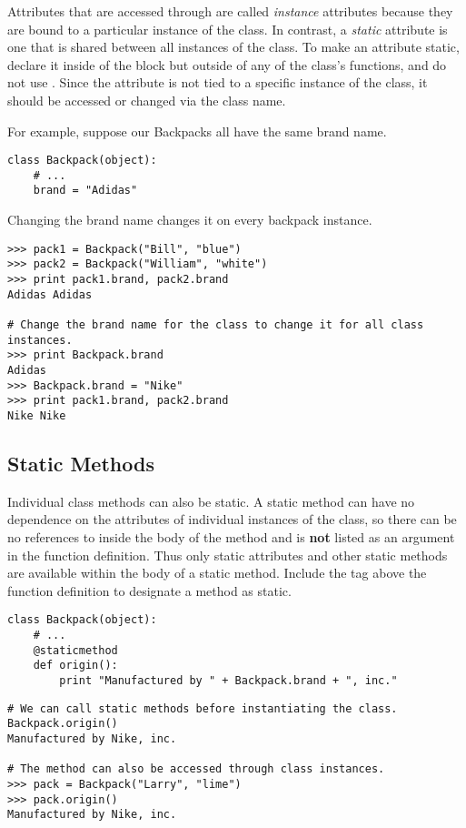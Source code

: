 Attributes that are accessed through  are called \emph{instance} attributes because they are bound to a particular instance of the class.
In contrast, a \emph{static} attribute is one that is shared between all instances of the class.
To make an attribute static, declare it inside of the  block but outside of any of the class's functions, and do not use .
Since the attribute is not tied to a specific instance of the class, it should be accessed or changed via the class name.

For example, suppose our Backpacks all have the same brand name.

\begin{lstlisting}
class Backpack(object):
    # ...
    brand = "Adidas"
\end{lstlisting}

Changing the brand name changes it on every backpack instance.

\begin{lstlisting}
>>> pack1 = Backpack("Bill", "blue")
>>> pack2 = Backpack("William", "white")
>>> print pack1.brand, pack2.brand
Adidas Adidas

# Change the brand name for the class to change it for all class instances.
>>> print Backpack.brand
Adidas
>>> Backpack.brand = "Nike"
>>> print pack1.brand, pack2.brand
Nike Nike
\end{lstlisting}

\subsection*{Static Methods} %

Individual class methods can also be static.
A static method can have no dependence on the attributes of individual instances of the class, so there can be no references to  inside the body of the method and  is \textbf{not} listed as an argument in the function definition.
Thus only static attributes and other static methods are available within the body of a static method.
Include the tag  above the function definition to designate a method as static.

\begin{lstlisting}
class Backpack(object):
    # ...
    @staticmethod
    def origin():
        print "Manufactured by " + Backpack.brand + ", inc."
\end{lstlisting}

\begin{lstlisting}
# We can call static methods before instantiating the class.
Backpack.origin()
Manufactured by Nike, inc.

# The method can also be accessed through class instances.
>>> pack = Backpack("Larry", "lime")
>>> pack.origin()
Manufactured by Nike, inc.
\end{lstlisting}


